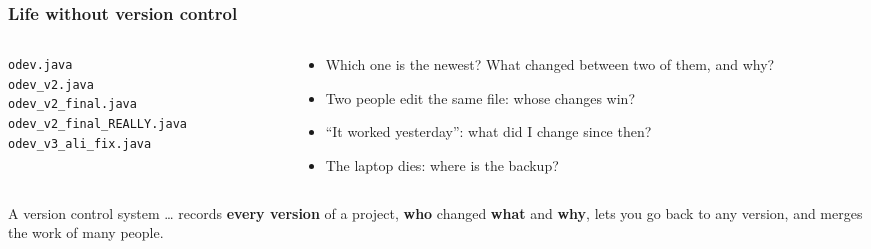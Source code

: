 \documentclass[aspectratio=169,10pt,compress]{beamer}
\begin{document}
\begin{frame}[t,fragile] \frametitle{Life without version control}
  \begin{columns}[T]
    \begin{column}{0.46\textwidth}


\begin{lstlisting}[style=codesnippet, language={}, basicstyle=\ttfamily\footnotesize]
odev.java
odev_v2.java
odev_v2_final.java
odev_v2_final_REALLY.java
odev_v3_ali_fix.java
\end{lstlisting}


    \end{column}
    \begin{column}{0.5\textwidth}
      \begin{itemize}\small
        \item Which one is the newest? What changed between two of them, and why?
        \item Two people edit the same file: whose changes win?
        \item ``It worked yesterday'': what did I change since then?
        \item The laptop dies: where is the backup?
      \end{itemize}
    \end{column}
  \end{columns}
  \begin{block}{A version control system \dots}
    \small records \textbf{every version} of a project, \textbf{who} changed \textbf{what} and \textbf{why}, lets you go back to any version,
    and merges the work of many people.
  \end{block}
\end{frame}
\end{document}
